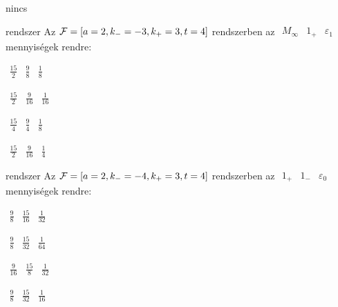 \documentclass[12pt]{article}
\begin{document}
\begin{quiz}{nincs}\begin{multi}{rendszer}
Az $  {\cal F}=\left[ a=2, k_{-}=-3, k_{+}=3, t=4 \right]  $ rendszerben az $ \begin{array}{ccc}M_{\infty}& 1_{+}& \varepsilon_{1}\end{array} $ mennyiségek rendre: 
\item* $ \begin{array}{ccc}\frac{15}{2}& \frac{9}{8}& \frac{1}{8}\end{array} $
\item  $ \begin{array}{ccc}\frac{15}{2}& \frac{9}{16}& \frac{1}{16}\end{array} $
\item  $ \begin{array}{ccc}\frac{15}{4}& \frac{9}{4}& \frac{1}{8}\end{array} $
\item  $ \begin{array}{ccc}\frac{15}{2}& \frac{9}{16}& \frac{1}{4}\end{array} $
\end{multi}

\begin{multi}{rendszer}
Az $  {\cal F}=\left[ a=2, k_{-}=-4, k_{+}=3, t=4 \right]  $ rendszerben az $ \begin{array}{ccc}1_{+}& 1_{-}& \varepsilon_{0}\end{array} $ mennyiségek rendre: 
\item* $ \begin{array}{ccc}\frac{9}{8}& \frac{15}{16}& \frac{1}{32}\end{array} $
\item  $ \begin{array}{ccc}\frac{9}{8}& \frac{15}{32}& \frac{1}{64}\end{array} $
\item  $ \begin{array}{ccc}\frac{9}{16}& \frac{15}{8}& \frac{1}{32}\end{array} $
\item  $ \begin{array}{ccc}\frac{9}{8}& \frac{15}{32}& \frac{1}{16}\end{array} $
\end{multi}


\end{quiz}
\end{document}
